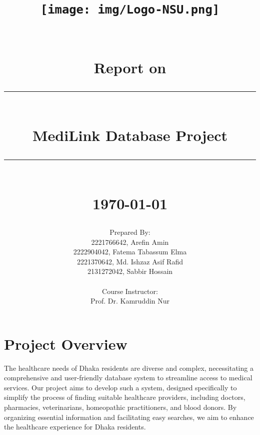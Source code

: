 \documentclass[11pt]{article}
\newcommand{\HRule}[1]{\rule{\linewidth}{#1}}
\begin{document}
\date{}

\title{ \normalsize 
		\\ [1.0cm]
		\texttt{[image: img/Logo-NSU.png]}  \\[.5cm]
		   \\[.5cm]
		\normalsize  \\ [1.0cm]
		Report on\\
		\HRule{2pt} \\
		\LARGE \textbf{MediLink Database Project} %
		\HRule{2pt} \\ [0.5cm]
		\normalsize \today \vspace*{5\baselineskip}}
		
\date{}

\author{
        Prepared By: \\[0.5cm]
		2221766642, Arefin Amin\\
        2222904042, Fatema Tabassum Elma\\
        2221370642, Md. Ishzaz Asif Rafid\\
        2131272042, Sabbir Hossain\\ \\
        Course Instructor:        \\[0.5cm]
		Prof. Dr. Kamruddin Nur \\
        \texttt{}
		 }
		 
\maketitle

\newpage

\tableofcontents
\clearpage
\listoffigures
\clearpage
\listoftables
\clearpage


\clearpage
\section*{Project Overview}
The healthcare needs of Dhaka residents are diverse and complex, necessitating a comprehensive and user-friendly database system to streamline access to medical services. Our project aims to develop such a system, designed specifically to simplify the process of finding suitable healthcare providers, including doctors, pharmacies, veterinarians, homeopathic practitioners, and blood donors. By organizing essential information and facilitating easy searches, we aim to enhance the healthcare experience for Dhaka residents. 
\end{document}
